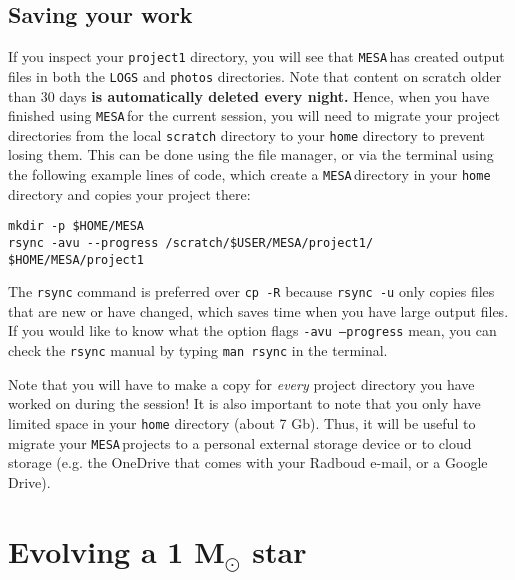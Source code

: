 \documentclass[11pt,a4paper]{article}
\newcommand{\MESA}{\texttt{MESA}\,}
\begin{document}
\subsection{Saving your work}
If you inspect your \texttt{project1} directory, you will see that \MESA has created output files in both the \texttt{LOGS} and \texttt{photos} directories.
%
Note that content on scratch older than 30 days \textbf{\color{red} is automatically deleted every night.}
Hence, when you have finished using \MESA for the current session, you will need to migrate your project directories from the local \texttt{scratch} directory to your \texttt{home} directory to prevent losing them. 
%
This can be done using the file manager, or via the terminal using the following example lines of code, which create a \MESA directory in your \texttt{home} directory and copies your project there:

\begin{lstlisting}
mkdir -p $HOME/MESA
rsync -avu --progress /scratch/$USER/MESA/project1/ $HOME/MESA/project1
\end{lstlisting}

\noindent
The \texttt{rsync} command is preferred over \texttt{cp -R} because \texttt{rsync -u} only copies files that are new or have changed, which saves time when you have large output files. If you would like to know what the option flags \texttt{-avu --progress} mean, you can check the \texttt{rsync} manual by typing \texttt{man rsync} in the terminal.

Note that you will have to make a copy for \emph{every} project directory you have worked on during the session! It is also important to note that you only have limited space in your \texttt{home} directory (about 7 Gb). Thus, it will be useful to migrate your \MESA projects to a personal external storage device or to cloud storage (e.g. the OneDrive that comes with your Radboud e-mail, or a Google Drive). 



\section{Evolving a 1 \texorpdfstring{M$_\odot$}{Msun} star}
\end{document}
